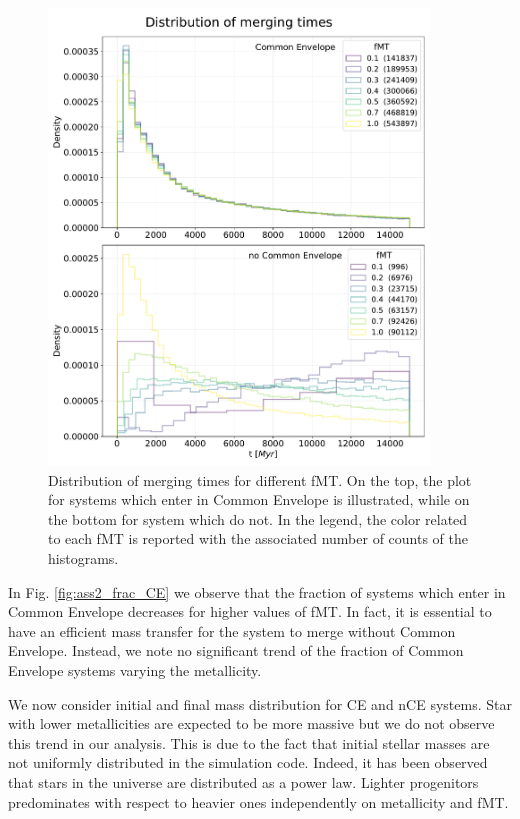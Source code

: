 \documentclass[prb,twocolumn,9pt]{revtex4-1}
\begin{document}
\begin{figure}[hbp]
    \begin{minipage}[c]{1.0\columnwidth}
    \centering
    \includegraphics[width=0.9\textwidth]{images/assignment2_1/hist_dtimes_fMT.pdf}
    \caption{Distribution of merging times for different fMT. On the top, the plot for systems which enter in Common Envelope is illustrated, while on the bottom for system which do not.
    In the legend, the color related to each  fMT is reported  with the associated number of counts of the histograms. }
    \label{fig:ass2_1_tmerg}
    \end{minipage}
\end{figure}



In Fig. \ref{fig:ass2_frac_CE} we observe that the fraction of systems which enter in Common Envelope decreases for higher values of fMT. In fact, it is essential to have an efficient mass transfer for the system to merge without Common Envelope. Instead, we note no significant trend of the fraction of Common Envelope systems varying the metallicity.

We now consider initial and final mass distribution for CE and nCE systems. 
Star with lower metallicities are expected to be more massive but we do not observe this trend in our analysis. This is due to the fact that initial stellar masses are not uniformly distributed in the simulation code. Indeed, it has been observed that stars in the universe are distributed as a power law. Lighter progenitors predominates with respect to heavier ones independently on metallicity and fMT.
\end{document}
